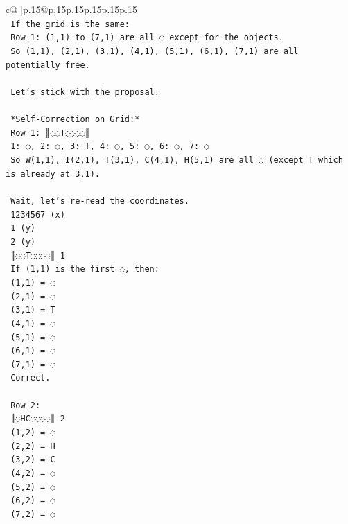 \documentclass{article}
\begin{document}
{\begin{supertabular}{c@{$\;$}|p{.15\linewidth}@{}p{.15\linewidth}p{.15\linewidth}p{.15\linewidth}p{.15\linewidth}p{.15\linewidth}}
{{{\\ 
\texttt{    If the grid is the same:} \\
\texttt{    Row 1: (1,1) to (7,1) are all ◌ except for the objects.} \\
\texttt{    So (1,1), (2,1), (3,1), (4,1), (5,1), (6,1), (7,1) are all potentially free.} \\
\\ 
\texttt{    Let's stick with the proposal.} \\
\\ 
\texttt{    *Self{-}Correction on Grid:*} \\
\texttt{    Row 1: ║◌◌T◌◌◌◌║} \\
\texttt{    1: ◌, 2: ◌, 3: T, 4: ◌, 5: ◌, 6: ◌, 7: ◌} \\
\texttt{    So W(1,1), I(2,1), T(3,1), C(4,1), H(5,1) are all ◌ (except T which is already at 3,1).} \\
\\ 
\texttt{    Wait, let's re{-}read the coordinates.} \\
\texttt{    1234567 (x)} \\
\texttt{    1 (y)} \\
\texttt{    2 (y)} \\
\texttt{    ║◌◌T◌◌◌◌║ 1} \\
\texttt{    If (1,1) is the first ◌, then:} \\
\texttt{    (1,1) = ◌} \\
\texttt{    (2,1) = ◌} \\
\texttt{    (3,1) = T} \\
\texttt{    (4,1) = ◌} \\
\texttt{    (5,1) = ◌} \\
\texttt{    (6,1) = ◌} \\
\texttt{    (7,1) = ◌} \\
\texttt{    Correct.} \\
\\ 
\texttt{    Row 2:} \\
\texttt{    ║◌HC◌◌◌◌║ 2} \\
\texttt{    (1,2) = ◌} \\
\texttt{    (2,2) = H} \\
\texttt{    (3,2) = C} \\
\texttt{    (4,2) = ◌} \\
\texttt{    (5,2) = ◌} \\
\texttt{    (6,2) = ◌} \\
\texttt{    (7,2) = ◌} \\
\\ 
}}}
\end{supertabular}}
\end{document}
